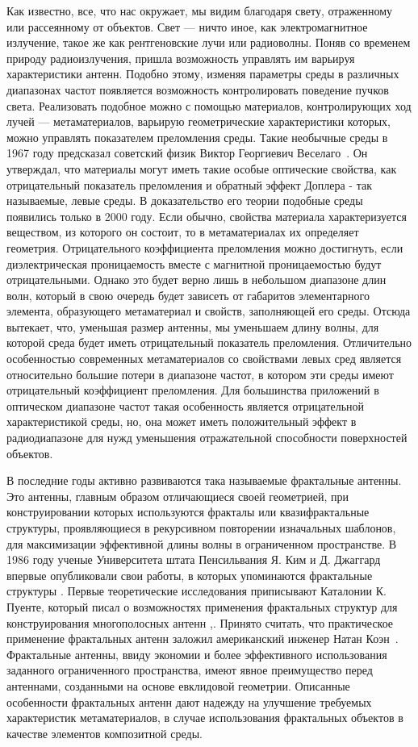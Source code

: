 Как известно, все, что нас окружает, мы видим благодаря свету, отраженному или рассеянному от объектов. Свет --- ничто иное, как электромагнитное излучение, такое же как рентгеновские лучи или радиоволны. Поняв со временем природу радиоизлучения, пришла возможность управлять им варьируя характеристики антенн. Подобно этому, изменяя параметры среды в различных диапазонах частот появляется возможность контролировать поведение пучков света. Реализовать подобное можно с помощью материалов, контролирующих ход лучей --- метаматериалов, варьирую геометрические характеристики которых, можно управлять показателем преломления среды. 
Такие необычные среды в 1967 году предсказал советский физик Виктор Георгиевич Веселаго~\cite{b11}. Он утверждал, что материалы могут иметь такие особые оптические свойства, как отрицательный показатель преломления и обратный эффект Доплера - так называемые, левые среды. В доказательство его теории подобные среды появились только в 2000 году. Если обычно, свойства материала характеризуется веществом, из которого он состоит, то в метаматериалах их определяет геометрия. Отрицательного коэффициента преломления можно достигнуть, если диэлектрическая проницаемость вместе с магнитной проницаемостью будут отрицательными. Однако это будет верно лишь в небольшом диапазоне длин волн, который в свою очередь будет зависеть от габаритов элементарного элемента, образующего метаматериал и свойств, заполняющей его среды. Отсюда вытекает, что, уменьшая размер антенны, мы уменьшаем длину волны, для которой среда будет иметь отрицательный показатель преломления. Отличительно особенностью современных метаматериалов со свойствами левых сред является относительно большие потери в диапазоне частот, в котором эти среды имеют отрицательный коэффициент преломления. Для большинства приложений в оптическом диапазоне частот такая особенность является отрицательной характеристикой среды, но, она может иметь положительный эффект в радиодиапазоне для нужд уменьшения отражательной способности поверхностей объектов.

В последние годы активно развиваются така называемые фрактальные антенны. Это антенны, главным образом отличающиеся своей геометрией, при конструировании которых используются фракталы или квазифрактальные структуры, проявляющиеся в рекурсивном повторении изначальных шаблонов, для максимизации эффективной длины волны в ограниченном пространстве. В 1986 году ученые Университета штата Пенсильвания Я. Ким и Д. Джаггард впервые опубликовали свои работы, в которых упоминаются фрактальные структуры \cite{b1}. Первые теоретические исследования приписывают Каталонии К. Пуенте, который писал о возможностях применения фрактальных структур для конструирования многополосных антенн \cite{b8},\cite{b9}. Принято считать, что практическое применение фрактальных антенн заложил американский инженер Натан Коэн~\cite{b10}. Фрактальные антенны, ввиду экономии и более эффективного использования заданного ограниченного пространства, имеют явное преимущество перед антеннами, созданными на основе евклидовой геометрии. Описанные особенности фрактальных антенн дают надежду на улучшение требуемых характеристик метаматериалов, в случае использования фрактальных объектов в качестве элементов композитной среды.

